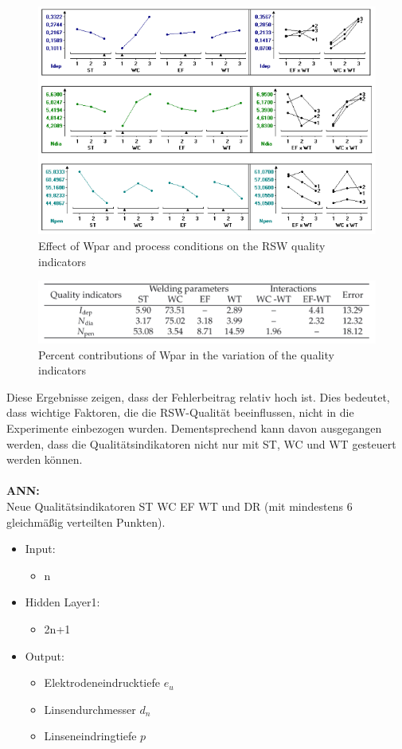 \documentclass[english,ngerman]{tudscrreprt}
\begin{document}
\begin{figure}[H]
\centering
\includegraphics{./Bilder/Effect of Wpar and process conditions on the RSW quality indicators.png}
\caption{Effect of Wpar and process conditions on the RSW quality indicators}\label{fgg:AONVA1}
\end{figure}
\begin{figure}[H]
\centering
\includegraphics{./Bilder/Percent contributions of Wpar in the variation of the quality indicators.png}
\caption{Percent contributions of Wpar in the variation of the quality indicators}\label{fgg:AONVA2}
\end{figure}
Diese Ergebnisse zeigen, dass der Fehlerbeitrag relativ hoch ist. Dies bedeutet, dass wichtige Faktoren, die die RSW-Qualität beeinflussen, nicht in die Experimente einbezogen wurden. Dementsprechend kann davon ausgegangen werden, dass die Qualitätsindikatoren nicht nur mit ST, WC und WT gesteuert werden können.\\
\\
\textbf{ANN: }\\
Neue Qualitätsindikatoren ST WC EF WT und DR (mit mindestens 6 gleichmäßig verteilten Punkten). 
\begin{itemize}
\item Input:
\begin{itemize}
	\item n
\end{itemize}
\item Hidden Layer1:
\begin{itemize}
	\item 2n+1
\end{itemize}
\item Output:
\begin{itemize}
	\item Elektrodeneindrucktiefe $e_{u}$
	\item Linsendurchmesser $d_{n}$ 
	\item Linseneindringtiefe $p$
\end{itemize}
\end{itemize}
\end{document}
